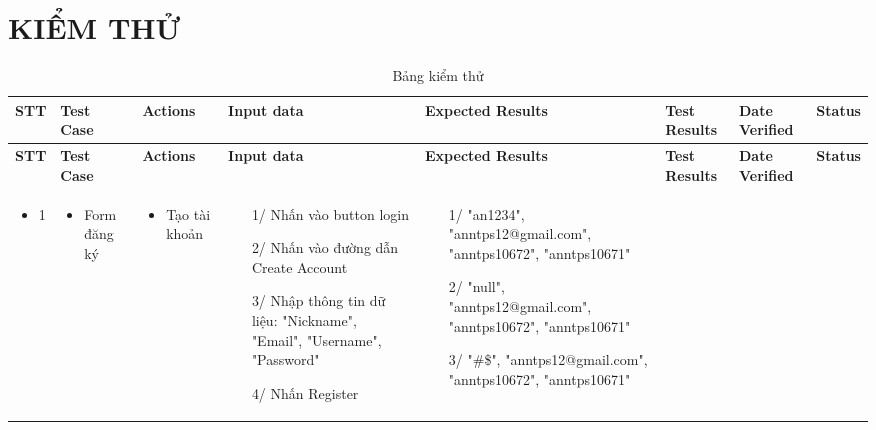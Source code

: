 \chapter{KIỂM THỬ}

\begin{center}
\begin{landscape}
\footnotesize
\begin{longtabu} to 
\caption{Bảng kiểm thử} \\
   \hline \textbf{STT}  & \textbf{Test Case} & \textbf{Actions} & \textbf{Input data} & \textbf{Expected Results} & \textbf{Test Results} & \textbf{Date Verified} & \textbf{Status} \\ \hline
   \endfirsthead
  \hline \textbf{STT}  & \textbf{Test Case} & \textbf{Actions} & \textbf{Input data} & \textbf{Expected Results} & \textbf{Test Results} & \textbf{Date Verified} & \textbf{Status} \\ \hline
   \endhead
      \begin{itemize}[leftmargin=*,label={}]
      \item 1
      \end{itemize} 
      & 
      \begin{itemize}[leftmargin=*,label={}]
      \item Form đăng ký  
      \end{itemize}
      & 
      \begin{itemize}[leftmargin=*,label={}]
      \item Tạo tài khoản 
      \end{itemize}
      & 
      \begin{itemize}[leftmargin=*]
      \item[1/] Nhấn vào button login
      \item[2/] Nhấn vào đường dẫn Create Account
      \item[3/] Nhập thông tin dữ liệu: "Nickname", "Email", "Username", "Password"
      \item[4/] Nhấn Register
      \end{itemize}
       & 
      \begin{itemize}[leftmargin=*]
      \item[1/] "an1234", "anntps12@gmail.com", "anntps10672", "anntps10671"
      \item[2/] "null", "anntps12@gmail.com", "anntps10672", "anntps10671"
      \item[3/] "\@\@\#\$", "anntps12@gmail.com", "anntps10672", "anntps10671"

\end{itemize}
\end{longtabu}
\end{landscape}
\end{center}
